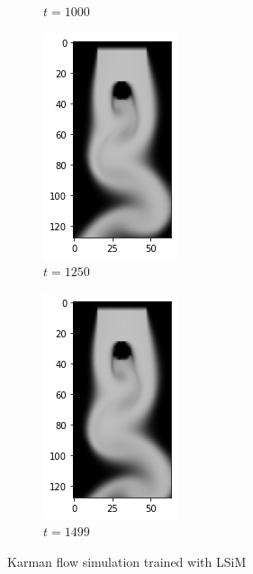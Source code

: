 \documentclass[a4paper,12pt,twoside]{report}
\begin{document}
\begin{figure}
\begin{subfigure}{0.18\textwidth}
		\caption{$t=1000$}
	\end{subfigure}
	\begin{subfigure}{0.18\textwidth}
		\centering
		\includegraphics[scale=0.5]{karmanflow/lsim_density_001250.png}
		\caption{$t=1250$}
	\end{subfigure}
	\begin{subfigure}{0.18\textwidth}
		\centering
		\includegraphics[scale=0.5]{karmanflow/lsim_density_001499.png}
		\caption{$t=1499$}
	\end{subfigure}
	\caption{Karman flow simulation trained with LSiM}
\end{figure}
\end{document}
